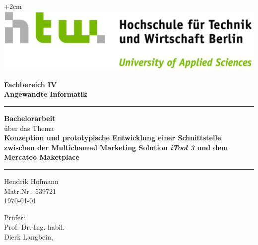 \documentclass[9.5pt,a4paper,bibliography=totocnumbered,listof=totocnumbered]{scrartcl}
\begin{document}
\begin{center}
		\vspace*{.2cm}
		\begin{flushright}
			\advance\rightskip+2cm
			\includegraphics[width=.4\textwidth]{img/HTW-quer-rgb.pdf} %
		\end{flushright}
	\vspace*{3cm}
	\Large
	\textbf{Fachbereich IV}\\
	\textbf{Angewandte Informatik}\\
	\vspace*{2cm}
	{\rule{\linewidth}{0.5mm}}
	\Huge
	\textbf{Bachelorarbeit}\\
	\vspace*{0.5cm}
	\large
	über das Thema\\
	\vspace*{1cm}
	\textbf{Konzeption und prototypische Entwicklung einer Schnittstelle zwischen der Multichannel Marketing Solution \textit{iTool 3} und dem Mercateo Maketplace}\\
	{\rule{\linewidth}{0.5mm}}
	\vspace*{2cm}
	
	\vfill
	\normalsize
		\begin{minipage}[t]{0.4\textwidth}
			\begin{flushleft} %
				
				Hendrik Hofmann\\ Matr.Nr.: 539721 \\{\today}
				
			\end{flushleft}
		\end{minipage}
		\begin{minipage}[t]{0.3\textwidth}
			\begin{flushright} %
				  Prüfer: \\Prof. Dr.-Ing. habil. \\Dierk Langbein, \\ 
			\end{flushright}
		\end{minipage}
\end{center}
\pagebreak



\renewcommand{\cfttabpresnum}{Tab. }
\renewcommand{\cftfigpresnum}{Abb. }
\settowidth{\cfttabnumwidth}{Abb. 10\quad}
\settowidth{\cftfignumwidth}{Abb. 10\quad}
\end{document}
